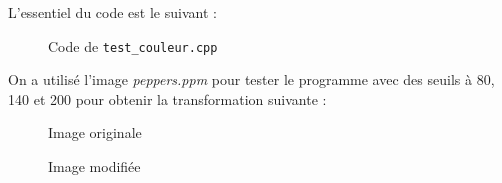 \documentclass[french,a4paper,10pt]{article}
\begin{document}
	L'essentiel du code est le suivant : %
	\begin{figure}[!htb]
		\centering
		\caption{Code de \texttt{test\_couleur.cpp}}\label{Fig:test-couleur-code}
	\end{figure}

	On a utilis\'e l'image \emph{peppers.ppm} pour tester le programme avec des seuils à 80, 140 et 200 pour obtenir la
	transformation suivante :
	\begin{figure}[!htb]
		\begin{minipage}{0.48\textwidth}
			\centering
			\caption{Image originale}\label{Fig:orig-peppers}
		\end{minipage}\hfill
		\begin{minipage}{0.48\textwidth}
			\centering
			\caption{Image modifiée}\label{Fig:test-couleur-peppers}
		\end{minipage}
	\end{figure}
\end{document}
